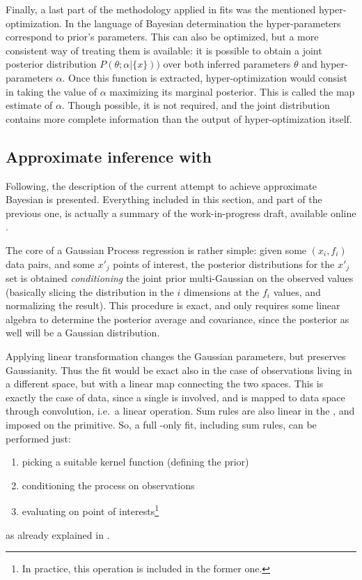 Finally, a last part of the methodology applied in \nnpdf fits was the
mentioned hyper-optimization.
In the language of Bayesian determination the hyper-parameters correspond to
prior's parameters.
This can also be optimized, but a more consistent way of treating them is
available: it is possible to obtain a joint posterior distribution
$P\left(\theta;\alpha|\{x\}\right))$ over both inferred parameters $\theta$ and
hyper-parameters $\alpha$.
%
Once this function is extracted, hyper-optimization would consist in taking the
value of $\alpha$ maximizing its marginal posterior. This is called the
\acrfull{map} estimate of $\alpha$.
Though possible, it is not required, and the joint distribution contains more
complete information than the output of hyper-optimization itself.

\subsection{Approximate inference with \lsqfitgp}
\label{sec:gp/lsqfitgp}

Following, the description of the current attempt to achieve approximate
Bayesian \pdfs is presented.
Everything included in this section, and part of the previous one, is actually
a summary of the work-in-progress draft, available online \cite{petrillo2022}.

The core of a Gaussian Process regression is rather simple: given some $(x_i,
f_i)$ data pairs, and some $x'_j$ points of interest, the posterior
distributions for the $x'_j$ set is obtained \textit{conditioning} the joint
prior multi-Gaussian on the observed values (basically slicing the
distribution in the $i$ dimensions at the $f_i$ values, and normalizing the
result).
%
This procedure is exact, and only requires some linear algebra to determine the
posterior average and covariance, since the posterior as well will be a
Gaussian distribution.

Applying linear transformation changes the Gaussian parameters, but preserves
Gaussianity. Thus the fit would be exact also in the case of observations
living in a different space, but with a linear map connecting the two spaces.
%
This is exactly the case of \dis data, since a single \pdf is involved, and is
mapped to data space through convolution, i.e.\ a linear operation.
%
Sum rules are also linear in the \pdfs, and imposed on the primitive. So, a
full \dis-only fit, including sum rules, can be performed just:
\begin{enumerate}
  \item picking a suitable kernel function (defining the prior)
  \item conditioning the process on observations
  \item evaluating on point of interests\footnote{
      In practice, this operation is included in the former one.
    }
\end{enumerate}
as already explained in \cite{DelDebbio:2021whr}.

